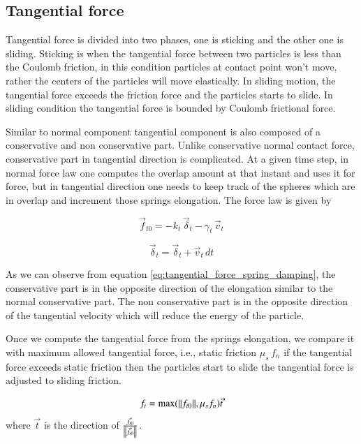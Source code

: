 \subsection{Tangential force}
\label{sec:tangential-force}

Tangential force is divided into two phases, one is sticking and the other one
is sliding. Sticking is when the tangential force between two particles is less
than the Coulomb friction, in this condition particles at contact point won't
move, rather the centers of the particles will move elastically. In sliding
motion, the tangential force exceeds the friction force and the particles starts
to slide. In sliding condition the tangential force is bounded by Coulomb
frictional force.

Similar to normal component tangential component is also composed
of a conservative and non conservative part. Unlike conservative normal contact
force, conservative part in tangential direction is complicated. At a given time
step, in normal force law one computes the overlap amount at that instant and
uses it for force, but in tangential direction one needs to keep track of the
spheres which are in overlap and increment those springs elongation. The force
law is given by

\begin{equation}
  \label{eq:tangential_force_spring_damping}
  \vec{f}_{t0} = -k_t \, \vec{\delta}_t - \gamma_t \, \vec{v}_t
\end{equation}


\begin{equation*}
  \vec{\delta}_t = \vec{\delta}_t + \vec{v}_t \, dt
\end{equation*}

As we can observe from equation \ref{eq:tangential_force_spring_damping},
the conservative part is in the opposite direction of the elongation similar
to the normal conservative part. The non conservative part is in the opposite
direction of the tangential velocity which will reduce the energy of the
particle.

Once we compute the tangential force from the springs elongation, we compare it
with maximum allowed tangential force, i.e., static friction $\mu_s \, f_n$ if
the tangential force exceeds static friction then the particles start to slide
the tangential force is adjusted to sliding friction.

\begin{equation}
  \label{eq:tangential_force_spring_damping}
  f_t = \max(\norm{f_{t0}}, \mu_s f_n) \vec{t}
\end{equation}
where $\vec{t}$ is the direction of $\frac{\vec{f}_{t0}}{\norm{\vec{f}_{t0}}}$.



